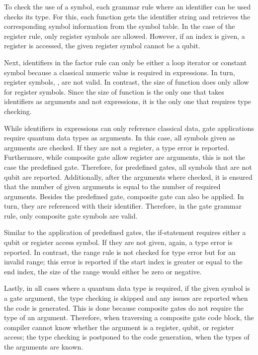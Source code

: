 To check the use of a symbol, each grammar rule where an identifier can be used checks its type. For this, each function gets the identifier string and retrieves the corresponding symbol information from the symbol table. In the case of the register rule, only register symbols are allowed. However, if an index is given, \ie a register is accessed, the given register symbol cannot be a qubit. 

Next, identifiers in the factor rule can only be either a loop iterator or constant symbol because a classical numeric value is required in expressions. In turn, register symbols, \eg, are not valid. In contrast, the size of function does only allow for register symbols. Since the size of function is the only one that takes identifiers as arguments and not expressions, it is the only one that requires type checking.

While identifiers in expressions can only reference classical data, gate applications require quantum data types as arguments. In this case, all symbols given as arguments are checked. If they are not a register, a type error is reported. Furthermore, while composite gate allow register are arguments, this is not the case the predefined gate. Therefore, for predefined gates, all symbols that are not qubit are reported. Additionally, after the arguments where checked, it is ensured that the number of given arguments is equal to the number of required arguments. Besides the predefined gate, composite gate can also be applied. In turn, they are referenced with their identifier. Therefore, in the gate grammar rule, only composite gate symbols are valid. 

Similar to the application of predefined gates, the if-statement requires either a qubit or register access symbol. If they are not given, again, a type error is reported. In contrast, the range rule is not checked for type error but for an invalid range; this error is reported if the start index is greater or equal to the end index, \ie the size of the range would either be zero or negative. 

Lastly, in all cases where a quantum data type is required, if the given symbol is a gate argument, the type checking is skipped and any issues are reported when the code is generated. This is done because composite gates do not require the type of an argument. Therefore, when traversing a composite gate code block, the compiler cannot know whether the argument is a register, qubit, or register access; the type checking is postponed to the code generation, when the types of the arguments are known.


